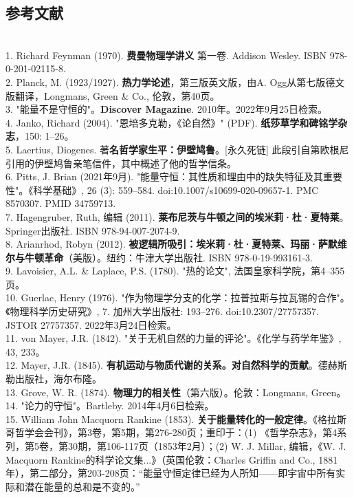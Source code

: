 \subsection{参考文献}\\
1. Richard Feynman (1970). \textbf{费曼物理学讲义} 第一卷. Addison Wesley. ISBN 978-0-201-02115-8.\\
2. Planck, M. (1923/1927). \textbf{热力学论述}，第三版英文版，由A. Ogg从第七版德文版翻译，Longmans, Green & Co., 伦敦，第40页。\\
3. "能量不是守恒的"。\textbf{Discover Magazine}. 2010年。2022年9月25日检索。\\
4. Janko, Richard (2004). "恩培多克勒，《论自然》" (PDF). \textbf{纸莎草学和碑铭学杂志}，150: 1–26。\\
5. Laertius, Diogenes. 著\textbf{名哲学家生平：伊壁鸠鲁}。[永久死链] 此段引自第欧根尼引用的伊壁鸠鲁亲笔信件，其中概述了他的哲学信条。\\
6. Pitts, J. Brian (2021年9月). "能量守恒：其性质和理由中的缺失特征及其重要性"。《科学基础》, 26 (3): 559–584. doi:10.1007/s10699-020-09657-1. PMC 8570307. PMID 34759713.\\
7. Hagengruber, Ruth, 编辑 (2011). \textbf{莱布尼茨与牛顿之间的埃米莉·杜·夏特莱}。\\Springer出版社. ISBN 978-94-007-2074-9.\\
8. Arianrhod, Robyn (2012). \textbf{被逻辑所吸引：埃米莉·杜·夏特莱、玛丽·萨默维尔与牛顿革命}（美版）。纽约：牛津大学出版社. ISBN 978-0-19-993161-3.\\
9. Lavoisier, A.L. & Laplace, P.S. (1780). "热的论文", 法国皇家科学院，第4–355页。\\
10. Guerlac, Henry (1976). "作为物理学分支的化学：拉普拉斯与拉瓦锡的合作"。《物理科学历史研究》, 7. 加州大学出版社: 193–276. doi:10.2307/27757357. JSTOR 27757357. 2022年3月24日检索。\\
11. von Mayer, J.R. (1842). "关于无机自然的力量的评论"。《化学与药学年鉴》, 43, 233。\\
12. Mayer, J.R. (1845). \textbf{有机运动与物质代谢的关系。对自然科学的贡献}。德赫斯勒出版社，海尔布隆。\\
13. Grove, W. R. (1874). \textbf{物理力的相关性}（第六版）。伦敦：Longmans, Green。\\
14. "论力的守恒"。Bartleby. 2014年4月6日检索。\\
15. William John Macquorn Rankine (1853). \textbf{关于能量转化的一般定律}。《格拉斯哥哲学会会刊》，第3卷，第5期，第276-280页；重印于：(1) 《哲学杂志》，第4系列，第5卷，第30期，第106-117页（1853年2月）；(2) W. J. Millar, 编辑，《W. J. Macquorn Rankine的科学论文集...》（英国伦敦：Charles Griffin and Co., 1881年），第二部分，第203-208页：“能量守恒定律已经为人所知——即宇宙中所有实际和潜在能量的总和是不变的。”\\
